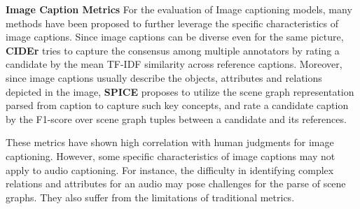 \documentclass{article}
\begin{document}



\noindent\textbf{Image Caption Metrics}
\quad   For the evaluation of Image captioning models, many methods have been proposed to further leverage the specific characteristics of image captions. Since image captions can be diverse even for the same picture, \textbf{CIDEr} \cite{vedantam2015cider} tries to capture the consensus among multiple annotators by rating a candidate by the mean TF-IDF similarity across reference captions. Moreover, since image captions usually describe the objects, attributes and relations depicted in the image, \textbf{SPICE} \cite{anderson2016spice} proposes to utilize the scene graph representation parsed from caption to capture such key concepts, and rate a candidate caption by the F1-score over scene graph tuples between a candidate and its references. 

These metrics have shown high correlation with human judgments for image captioning. However, some specific characteristics of image captions may not apply to audio captioning. For instance, the difficulty in identifying complex relations and attributes for an audio may pose challenges for the parse of scene graphs. They also suffer from the limitations of traditional metrics. 

\end{document}
